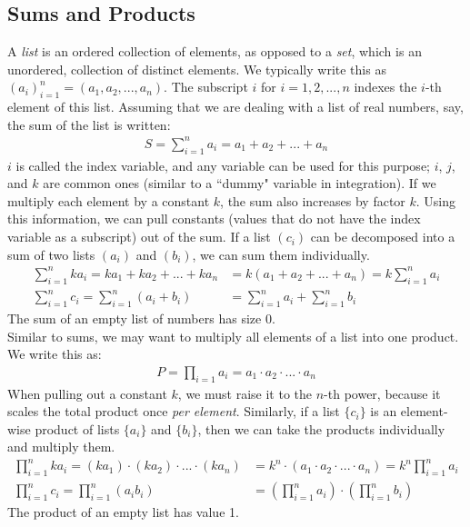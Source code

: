 \documentclass[11pt]{article}
\theoremstyle{plain}
\theoremstyle{definition}
\theoremstyle{remark}
\begin{document}
\subsection{Sums and Products}

A {\it list} is an ordered collection of elements, as opposed to a {\it set}, which is an unordered, collection of distinct elements. We typically write this as $(a_i)_{i=1}^n = (a_1, a_2,..., a_n)$. The subscript $i$ for $i = 1, 2,..., n$ indexes the $i$-th element of this list. Assuming that we are dealing with a list of real numbers, say, the sum of the list is written:
\begin{align*}
    S = \sum_{i=1}^n a_i = a_1 + a_2 + ... + a_n
\end{align*}
$i$ is called the index variable, and any variable can be used for this purpose; $i$, $j$, and $k$ are common ones (similar to a ``dummy" variable in integration). If we multiply each element by a constant $k$, the sum also increases by factor $k$. Using this information, we can pull constants (values that do not have the index variable as a subscript) out of the sum. If a list $(c_i)$ can be decomposed into a sum of two lists $(a_i)$ and $(b_i)$, we can sum them individually.
\begin{align*}
    \sum_{i=1}^n ka_i = ka_1 +ka_2 + ... + ka_n &= k(a_1 + a_2 + ... + a_n) = k\sum_{i=1}^n a_i\\
    \sum_{i=1}^n c_i = \sum_{i=1}^n (a_i + b_i) &= \sum_{i=1}^n a_i + \sum_{i=1}^n b_i
\end{align*}
The sum of an empty list of numbers has size 0.\\

Similar to sums, we may want to multiply all elements of a list into one product. We write this as:
\begin{align*}
    P = \prod_{i=1} a_i = a_1 \cdot a_2 \cdot ... \cdot a_n
\end{align*}
When pulling out a constant $k$, we must raise it to the $n$-th power, because it scales the total product once {\it per element}. Similarly, if a list $\{c_i\}$ is an element-wise product of lists $\{a_i\}$ and $\{b_i\}$, then we can take the products individually and multiply them.
\begin{align*}
    \prod_{i=1}^n ka_i = (ka_1)\cdot(ka_2)\cdot ... \cdot (ka_n) &= k^n \cdot (a_1 \cdot a_2 \cdot ... \cdot a_n) = k^n \prod_{i=1}^n a_i\\
    \prod_{i=1}^n c_i = \prod_{i=1}^n (a_i b_i) &= \left(\prod_{i=1}^n a_i \right) \cdot \left(\prod_{i=1}^n b_i\right) 
\end{align*}
The product of an empty list has value 1.
\end{document}
